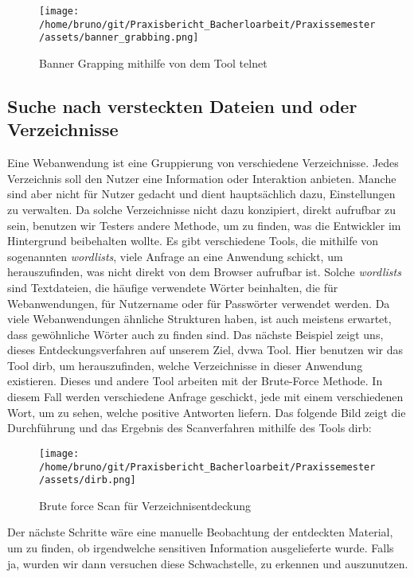\begin{figure}[h]
    \centering
    \texttt{[image: /home/bruno/git/Praxisbericht\_Bacherloarbeit/Praxissemester/assets/banner\_grabbing.png]}
    \caption{Banner Grapping mithilfe von dem Tool telnet}
    \centering
\end{figure}

\subsection{Suche nach versteckten Dateien und oder Verzeichnisse}

Eine Webanwendung ist eine Gruppierung von verschiedene Verzeichnisse. Jedes Verzeichnis soll den Nutzer eine Information oder Interaktion anbieten. Manche sind aber nicht für Nutzer gedacht und dient hauptsächlich dazu, Einstellungen zu verwalten. Da solche Verzeichnisse nicht dazu konzipiert, direkt aufrufbar zu sein, benutzen wir Testers andere Methode, um zu finden, was die Entwickler im Hintergrund beibehalten wollte. Es gibt verschiedene Tools, die mithilfe von sogenannten \textit{wordlists}, viele Anfrage an eine Anwendung schickt, um herauszufinden, was nicht direkt von dem Browser aufrufbar ist. Solche \textit{wordlists} sind Textdateien, die häufige verwendete Wörter beinhalten, die für Webanwendungen, für Nutzername oder für Passwörter verwendet werden. Da viele Webanwendungen ähnliche Strukturen haben, ist auch meistens erwartet, dass gewöhnliche Wörter auch zu finden sind. Das nächste Beispiel zeigt uns, dieses Entdeckungsverfahren auf unserem Ziel, \gls{dvwa} Tool. Hier benutzen wir das Tool \gls{dirb}, um herauszufinden, welche Verzeichnisse in dieser Anwendung existieren. Dieses und andere Tool arbeiten mit der Brute-Force Methode. In diesem Fall werden verschiedene Anfrage geschickt, jede mit einem verschiedenen Wort, um zu sehen, welche positive Antworten liefern. Das folgende Bild zeigt die Durchführung und das Ergebnis des Scanverfahren mithilfe des Tools \gls{dirb}:

\begin{figure}[h]
    \centering
    \texttt{[image: /home/bruno/git/Praxisbericht\_Bacherloarbeit/Praxissemester/assets/dirb.png]}
    \caption{Brute force Scan für Verzeichnisentdeckung}
    \centering
\end{figure}

Der nächste Schritte wäre eine manuelle Beobachtung der entdeckten Material, um zu finden, ob irgendwelche sensitiven Information ausgelieferte wurde. Falls ja, wurden wir dann versuchen diese \gls{Schwachstelle}, zu erkennen und auszunutzen.

